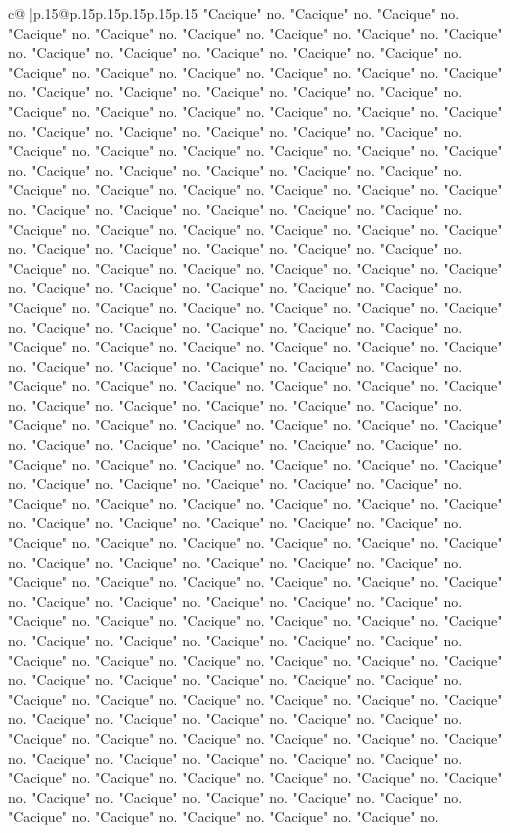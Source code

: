 \documentclass{article}
\begin{document}
{\begin{supertabular}{c@{$\;$}|p{.15\linewidth}@{}p{.15\linewidth}p{.15\linewidth}p{.15\linewidth}p{.15\linewidth}p{.15\linewidth}}
{{{"Cacique" no. "Cacique" no. "Cacique" no. "Cacique" no. "Cacique" no. "Cacique" no. "Cacique" no. "Cacique" no. "Cacique" no. "Cacique" no. "Cacique" no. "Cacique" no. "Cacique" no. "Cacique" no. "Cacique" no. "Cacique" no. "Cacique" no. "Cacique" no. "Cacique" no. "Cacique" no. "Cacique" no. "Cacique" no. "Cacique" no. "Cacique" no. "Cacique" no. "Cacique" no. "Cacique" no. "Cacique" no. "Cacique" no. "Cacique" no. "Cacique" no. "Cacique" no. "Cacique" no. "Cacique" no. "Cacique" no. "Cacique" no. "Cacique" no. "Cacique" no. "Cacique" no. "Cacique" no. "Cacique" no. "Cacique" no. "Cacique" no. "Cacique" no. "Cacique" no. "Cacique" no. "Cacique" no. "Cacique" no. "Cacique" no. "Cacique" no. "Cacique" no. "Cacique" no. "Cacique" no. "Cacique" no. "Cacique" no. "Cacique" no. "Cacique" no. "Cacique" no. "Cacique" no. "Cacique" no. "Cacique" no. "Cacique" no. "Cacique" no. "Cacique" no. "Cacique" no. "Cacique" no. "Cacique" no. "Cacique" no. "Cacique" no. "Cacique" no. "Cacique" no. "Cacique" no. "Cacique" no. "Cacique" no. "Cacique" no. "Cacique" no. "Cacique" no. "Cacique" no. "Cacique" no. "Cacique" no. "Cacique" no. "Cacique" no. "Cacique" no. "Cacique" no. "Cacique" no. "Cacique" no. "Cacique" no. "Cacique" no. "Cacique" no. "Cacique" no. "Cacique" no. "Cacique" no. "Cacique" no. "Cacique" no. "Cacique" no. "Cacique" no. "Cacique" no. "Cacique" no. "Cacique" no. "Cacique" no. "Cacique" no. "Cacique" no. "Cacique" no. "Cacique" no. "Cacique" no. "Cacique" no. "Cacique" no. "Cacique" no. "Cacique" no. "Cacique" no. "Cacique" no. "Cacique" no. "Cacique" no. "Cacique" no. "Cacique" no. "Cacique" no. "Cacique" no. "Cacique" no. "Cacique" no. "Cacique" no. "Cacique" no. "Cacique" no. "Cacique" no. "Cacique" no. "Cacique" no. "Cacique" no. "Cacique" no. "Cacique" no. "Cacique" no. "Cacique" no. "Cacique" no. "Cacique" no. "Cacique" no. "Cacique" no. "Cacique" no. "Cacique" no. "Cacique" no. "Cacique" no. "Cacique" no. "Cacique" no. "Cacique" no. "Cacique" no. "Cacique" no. "Cacique" no. "Cacique" no. "Cacique" no. "Cacique" no. "Cacique" no. "Cacique" no. "Cacique" no. "Cacique" no. "Cacique" no. "Cacique" no. "Cacique" no. "Cacique" no. "Cacique" no. "Cacique" no. "Cacique" no. "Cacique" no. "Cacique" no. "Cacique" no. "Cacique" no. "Cacique" no. "Cacique" no. "Cacique" no. "Cacique" no. "Cacique" no. "Cacique" no. "Cacique" no. "Cacique" no. "Cacique" no. "Cacique" no. "Cacique" no. "Cacique" no. "Cacique" no. "Cacique" no. "Cacique" no. "Cacique" no. "Cacique" no. "Cacique" no. "Cacique" no. "Cacique" no. "Cacique" no. "Cacique" no. "Cacique" no. "Cacique" no. "Cacique" no. "Cacique" no. "Cacique" no. "Cacique" no. "Cacique" no. "Cacique" no. "Cacique" no. "Cacique" no. "Cacique" no. "Cacique" no. "Cacique" no. "Cacique" no. "Cacique" no. "Cacique" no. "Cacique" no. "Cacique" no. "Cacique" no. "Cacique" no. "Cacique" no. "Cacique" no. "Cacique" no. "Cacique" no. "Cacique" no. "Cacique" no. "Cacique" no. "Cacique" no. "Cacique" no. "Cacique" no. "Cacique" no. "Cacique" no. "Cacique" no. "Cacique" no. "Cacique" no. "Cacique" no. "Cacique" no. "Cacique" no. "Cacique" no. "Cacique" no. "Cacique" no. "Cacique" no. "Cacique" no. "Cacique" no. }}}
\end{supertabular}}
\end{document}
